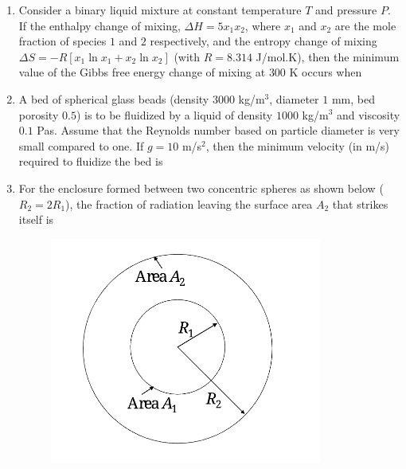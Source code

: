\documentclass[journal,12pt,onecolumn]{IEEEtran}
\theoremstyle{remark}
\begin{document}
\begin{enumerate}
\item Consider a binary liquid mixture at constant temperature $T$ and pressure $P$. If the enthalpy change of mixing, $\Delta H = 5x_1x_2$, where $x_1$ and $x_2$ are the mole fraction of species $1$ and $2$ respectively, and the entropy change of mixing $\Delta S = -R [x_1 \ln x_1 + x_2 \ln x_2]$ (with $R = 8.314$ J/mol.K), then the minimum value of the Gibbs free energy change of mixing at $300$ K occurs when
\hfill{}
\begin{enumerate}
\end{enumerate}

\item A bed of spherical glass beads (density $3000$ kg/m$^3$, diameter $1$ mm, bed porosity $0.5$) is to be fluidized by a liquid of density $1000$ kg/m$^3$ and viscosity $0.1$ Pas. Assume that the Reynolds number based on particle diameter is very small compared to one. If $g = 10$ m/s$^2$, then the minimum velocity (in m/s) required to fluidize the bed is
\hfill{}
\begin{enumerate}
\end{enumerate}

\item For the enclosure formed between two concentric spheres as shown below ($R_{2} = 2R_{1}$), the fraction of radiation leaving the surface area $A_{2}$ that strikes itself is
\hfill{}
\begin{figure}[H]
    \centering
\includegraphics[width=0.25\columnwidth]{figs/qn 33 .jpg}
    \caption{}
    \label{fig:qn33.jpg}
\end{figure}
\begin{enumerate}
\end{enumerate}


\end{enumerate}
\end{document}
